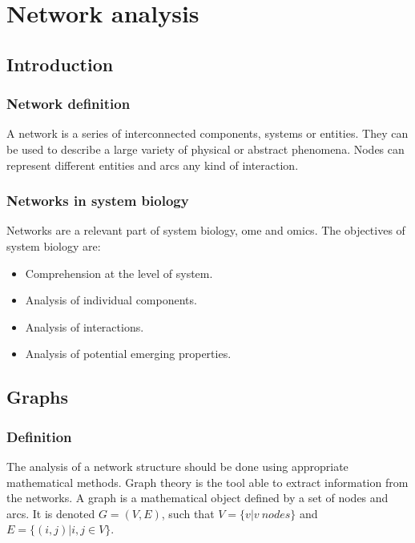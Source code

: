 \graphicspath{{chapters/07/images/}}
\chapter{Network analysis}

\section{Introduction}

	\subsection{Network definition}
	A network is a series of interconnected components, systems or entities.
	They can be used to describe a large variety of physical or abstract phenomena.
	Nodes can represent different entities and arcs any kind of interaction.

	\subsection{Networks in system biology}
	Networks are a relevant part of system biology, ome and omics.
	The objectives of system biology are:

	\begin{multicols}{2}
		\begin{itemize}
			\item Comprehension at the level of system.
			\item Analysis of individual components.
				\item Analysis of interactions.
			\item Analysis of potential emerging properties.
		\end{itemize}
	\end{multicols}

\section{Graphs}

	\subsection{Definition}
	The analysis of a network structure should be done using appropriate mathematical methods.
	Graph theory is the tool able to extract information from the networks.
	A graph is a mathematical object defined by a set of nodes and arcs.
	It is denoted $G = (V, E)$, such that $V = \{v|v\ nodes\}$ and $E = \{(i,j)|i,j\in V\}$.

